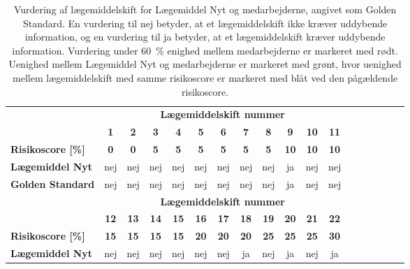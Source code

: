 \vspace{0.5cm}
\begin{longtable}{|l|c|c|c|c|c|c|c|c|c|c|c|c|c|c|c|c|c|}
\caption{Vurdering af lægemiddelskift for Lægemiddel Nyt og medarbejderne, angivet som Golden Standard. En vurdering til nej betyder, at et lægemiddelskift ikke kræver uddybende information, og en vurdering til ja betyder, at et lægemiddelskift kræver uddybende information. Vurdering under 60~\% enighed mellem medarbejderne er markeret med rødt. Uenighed mellem Lægemiddel Nyt og medarbejderne er markeret med grønt, hvor uenighed mellem lægemiddelskift med samme risikoscore er markeret med blåt ved den pågældende risikoscore.}
	\label{table:test2} \\ \hline
\rowcolor[HTML]{C0C0C0} \textbf{} & \multicolumn{11}{|c|}{\textbf{Lægemiddelskift nummer}} \\
\rowcolor[HTML]{C0C0C0} & \textbf{1} & \textbf{2} & \textbf{3} & \textbf{4} & \textbf{5} & \textbf{6} & \textbf{7} &  \textbf{8} & \textbf{9} & \textbf{10} & \textbf{11}   \\ \hline
\cellcolor[HTML]{C0C0C0}\textbf{Risikoscore [\%]} & \textbf{0}  & \textbf{0} &\textbf{5} & \textbf{5} & \textbf{5} & \textbf{5} & \textbf{5} & \textbf{5} & \cellcolor[HTML]{34CDF9}\textbf{10} &  \textbf{10} & \textbf{10} \\ \hline
\cellcolor[HTML]{C0C0C0}\textbf{Lægemiddel Nyt} & nej & nej & nej & nej & nej & nej & nej & nej & ja & nej & nej \\ \hline
\cellcolor[HTML]{C0C0C0}\textbf{Golden Standard} & nej & nej & nej& nej & nej &nej & nej & nej& ja & nej & nej \\ \hline
\newpage
\rowcolor[HTML]{C0C0C0} & \multicolumn{11}{|c|}{\textbf{Lægemiddelskift nummer}} \\
\rowcolor[HTML]{C0C0C0} & \textbf{12} & \textbf{13} & \textbf{14} &  \textbf{15} & \textbf{16} & \textbf{17} & \textbf{18} & \textbf{19} & \textbf{20} & \textbf{21} & \textbf{22}  \\ \hline
\cellcolor[HTML]{C0C0C0}\textbf{Risikoscore [\%]} & \textbf{15} & \textbf{15} & \cellcolor[HTML]{34CDF9}\textbf{15} & \textbf{15} & \textbf{20} & \textbf{20} & \cellcolor[HTML]{34CDF9}\textbf{20} & \textbf{25} & \cellcolor[HTML]{34CDF9}\textbf{25} & \textbf{25} & \cellcolor[HTML]{34CDF9}\textbf{30} \\ \hline
\cellcolor[HTML]{C0C0C0}\textbf{Lægemiddel Nyt} & nej & nej & \cellcolor[HTML]{32CB00}nej & nej & nej & nej & \cellcolor[HTML]{32CB00}ja & \cellcolor[HTML]{32CB00}nej & \cellcolor[HTML]{32CB00}ja & \cellcolor[HTML]{32CB00} nej & ja\\ \hline

\end{longtable}
